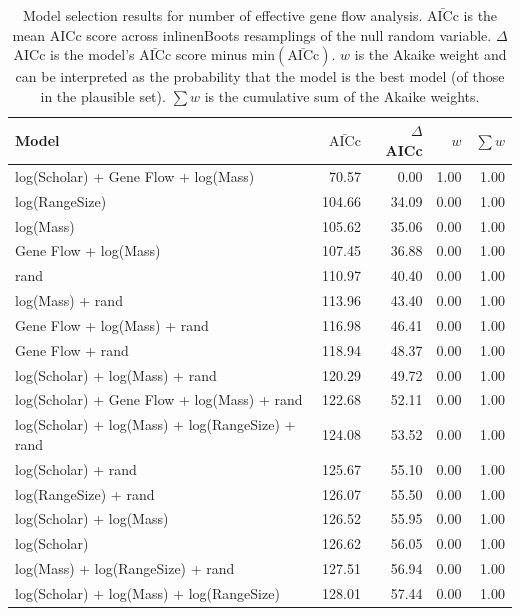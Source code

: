 \begin{table}[ht]
\centering
\caption[
  Full model selection results for number of effective gene flow analysis. 
]{
  Model selection results for number of effective gene flow analysis. 
  $\bar{\text{AICc}}$ is the mean AICc score across 
inline{nBoots} resamplings of the null random variable. 
  $\Delta$AICc is the model's $\bar{\text{AICc}}$ score minus $\text{min}(\bar{\text{AICc}})$. 
  $w$ is the Akaike weight and can be interpreted as the probability that the model is the best model (of those in the plausible set).
  $\sum w$ is the cumulative sum of the Akaike weights.
  } 
\label{A-fstModelWeights}
\begingroup\scriptsize
\begin{tabular}{@{}lrrrr@{}}
  \toprule
Model & $\bar{\text{AICc}}$ & $\Delta$AICc & $w$ & $\sum w$ \\ 
  \midrule
log(Scholar) + Gene Flow + log(Mass) & 70.57 & 0.00 & 1.00 & 1.00 \\ 
  log(RangeSize) & 104.66 & 34.09 & 0.00 & 1.00 \\ 
  log(Mass) & 105.62 & 35.06 & 0.00 & 1.00 \\ 
  Gene Flow + log(Mass) & 107.45 & 36.88 & 0.00 & 1.00 \\ 
  rand & 110.97 & 40.40 & 0.00 & 1.00 \\ 
  log(Mass) + rand & 113.96 & 43.40 & 0.00 & 1.00 \\ 
  Gene Flow + log(Mass) + rand & 116.98 & 46.41 & 0.00 & 1.00 \\ 
  Gene Flow + rand & 118.94 & 48.37 & 0.00 & 1.00 \\ 
  log(Scholar) + log(Mass) + rand & 120.29 & 49.72 & 0.00 & 1.00 \\ 
  log(Scholar) + Gene Flow + log(Mass) + rand & 122.68 & 52.11 & 0.00 & 1.00 \\ 
  log(Scholar) + log(Mass) + log(RangeSize) + rand & 124.08 & 53.52 & 0.00 & 1.00 \\ 
  log(Scholar) + rand & 125.67 & 55.10 & 0.00 & 1.00 \\ 
  log(RangeSize) + rand & 126.07 & 55.50 & 0.00 & 1.00 \\ 
  log(Scholar) + log(Mass) & 126.52 & 55.95 & 0.00 & 1.00 \\ 
  log(Scholar) & 126.62 & 56.05 & 0.00 & 1.00 \\ 
  log(Mass) + log(RangeSize) + rand & 127.51 & 56.94 & 0.00 & 1.00 \\ 
  log(Scholar) + log(Mass) + log(RangeSize) & 128.01 & 57.44 & 0.00 & 1.00 \\ 

\end{tabular}
\end{table}
